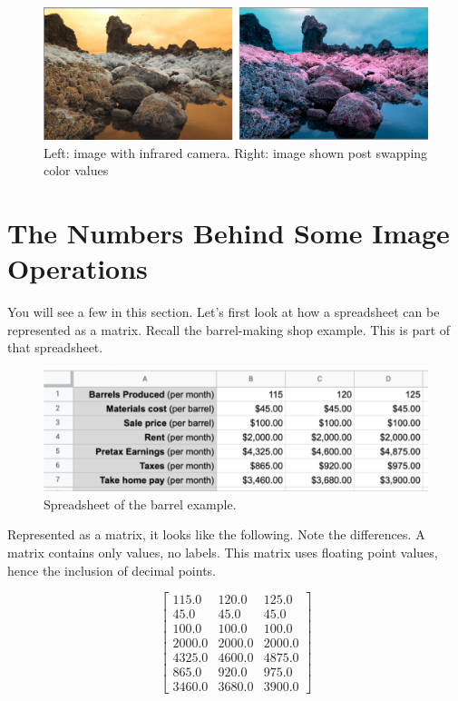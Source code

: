 \begin{figure}[htbp]
    \centering
    \includegraphics[width=1.0\textwidth]{infrared.png}
    \caption{Left: image with infrared camera. Right: image shown post swapping color values}
    \label{fig:infrared}
\end{figure}

\section{The Numbers Behind Some Image Operations}
You will see a few  in this section. Let's first look at how a 
spreadsheet can be represented as a matrix. Recall the barrel-making shop 
example. This is part of that spreadsheet. 
\begin{figure}[htbp]
    \centering
    \includegraphics[width=1.0\textwidth]{spreadsheet.png}
    \caption{Spreadsheet of the barrel example.}
    \label{fig:barrel-img}
\end{figure}

Represented as a matrix, it looks like the following. Note the differences. A 
matrix contains only values, no labels. This matrix uses floating point values, 
hence the inclusion of decimal points. 

$$\begin{bmatrix}
115.0 & 120.0 & 125.0\\
45.0 & 45.0 & 45.0\\
100.0 & 100.0 & 100.0\\
2000.0 & 2000.0 & 2000.0\\
4325.0 & 4600.0 & 4875.0\\
865.0 & 920.0 & 975.0\\
3460.0 & 3680.0 & 3900.0
\end{bmatrix}$$
 

